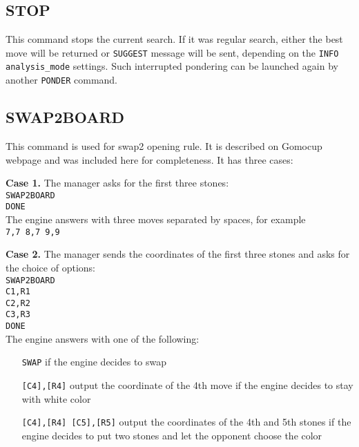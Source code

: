 \documentclass[12pt,a4paper]{article}
\begin{document}
\subsection{STOP}
\label{cmd_stop}
This command stops the current search. If it was regular search, either the best move will be returned or \texttt{SUGGEST} message will be sent, depending on the \texttt{INFO analysis{\_}mode} settings. Such interrupted pondering can be launched again by another \texttt{PONDER} command.


\subsection{SWAP2BOARD}
\label{cmd_swap2board}
This command is used for swap2 opening rule. It is described on Gomocup webpage and was included here for completeness. It has three cases:

\textbf{Case 1.} The manager asks for the first three stones:\\
\texttt{SWAP2BOARD}\\
\texttt{DONE}\\
The engine answers with three moves separated by spaces, for example\\
\texttt{7,7 8,7 9,9}

\textbf{Case 2.} The manager sends the coordinates of the first three stones and asks for the choice of options:\\
\texttt{SWAP2BOARD}\\
\texttt{C1,R1}\\
\texttt{C2,R2}\\
\texttt{C3,R3}\\
\texttt{DONE}\\
The engine answers with one of the following:
\begin{enumerate}[leftmargin=7.5em]
\item[\texttt{SWAP}]{if the engine decides to swap}
\item[\texttt{[C4],[R4]}]{output the coordinate of the 4th move if the engine decides to stay with white color}
\item[\texttt{[C4],[R4] [C5],[R5]}]{output the coordinates of the 4th and 5th stones if the engine decides to put two stones and let the opponent choose the color}
\end{enumerate}
\end{document}
